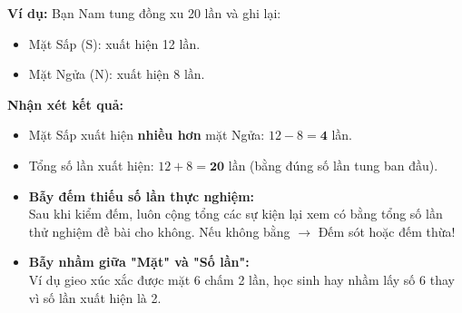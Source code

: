 \documentclass[14pt,a4paper,oneside]{extbook}
\begin{document}
\vspace{-2.5mm}
\noindent
\begin{minipage}[t]{0.49\textwidth}\vspace{0pt}
\begin{tcolorbox}[
  enhanced,
  colback=green!4!white,
  colframe=green!60!black,
  arc=2mm, boxrule=0.8pt,
  left=2mm, right=2mm, top=1.8mm, bottom=1.8mm,
  title={\footnotesize\bfseries\color{white}\faCheckCircle\ Ví dụ thực hành chuẩn mực}
]
{\footnotesize
\textbf{Ví dụ:} Bạn Nam tung đồng xu 20 lần và ghi lại:
\begin{itemize}\setlength{\itemsep}{1pt}\setlength{\leftskip}{-2.5mm}
  \item Mặt Sấp (S): xuất hiện 12 lần.
  \item Mặt Ngửa (N): xuất hiện 8 lần.
\end{itemize}
\textbf{Nhận xét kết quả:}
\begin{itemize}\setlength{\itemsep}{1pt}\setlength{\leftskip}{-2.5mm}
  \item Mặt Sấp xuất hiện \textbf{nhiều hơn} mặt Ngửa: $12 - 8 = \mathbf{4}$ lần.
  \item Tổng số lần xuất hiện: $12 + 8 = \mathbf{20}$ lần (bằng đúng số lần tung ban đầu).
\end{itemize}
}
\end{tcolorbox}
\end{minipage}
\hfill
\begin{minipage}[t]{0.49\textwidth}\vspace{0pt}
\begin{tcolorbox}[
  enhanced,
  colback=red!4!white,
  colframe=red!70!black,
  arc=2mm, boxrule=0.8pt,
  left=2mm, right=2mm, top=1.8mm, bottom=1.8mm,
  title={\footnotesize\bfseries\color{white}\faExclamationTriangle\ Mẹo tránh bẫy trắc nghiệm}
]
{\footnotesize
\begin{itemize}\setlength{\itemsep}{1.5pt}\setlength{\leftskip}{-2.5mm}
  \item \textbf{Bẫy đếm thiếu số lần thực nghiệm:}\\
  Sau khi kiểm đếm, luôn cộng tổng các sự kiện lại xem có bằng tổng số lần thử nghiệm đề bài cho không. Nếu không bằng $\to$ Đếm sót hoặc đếm thừa!
  \item \textbf{Bẫy nhầm giữa "Mặt" và "Số lần":}\\
  Ví dụ gieo xúc xắc được mặt 6 chấm 2 lần, học sinh hay nhầm lấy số 6 thay vì số lần xuất hiện là 2.
\end{itemize}
}
\end{tcolorbox}
\end{minipage}
\end{document}

